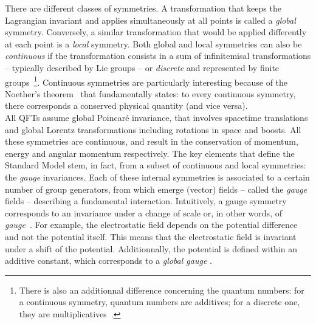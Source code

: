 There are different classes of symmetries. A transformation that keeps the Lagrangian invariant and applies simultaneously at all points is called a \textit{global} symmetry. Conversely, a similar transformation that would be applied differently at each point is a \textit{local} symmetry. Both global and local symmetries can also be \textit{continuous} if the transformation consists in a sum of infinitemisal transformations -- typically described by Lie groups -- or \textit{discrete} and represented by finite groups~\cite{peskinIntroductionQuantumField2018}\footnote{There is also an additionnal difference concerning the quantum numbers: for a continuous symmetry, quantum numbers are additives; for a discrete one, they are multiplicatives~\cite{braibantParticlesFundamentalInteractions2012}.}. Continuous symmetries are particularly interesting because of the Noether's theorem~\cite{noetherInvariantVariationProblems1971} that fundamentally states: to every continuous symmetry, there corresponds a conserved physical quantity (and vice versa).\\

All QFTs assume global Poincaré invariance, that involves spacetime translations and global Lorentz transformations including rotations in space and boosts. All these symmetries are continuous, and result in the conservation of momentum, energy and angular momentum respectively. The key elements that define the Standard Model stem, in fact, from a subset of continuous and local symmetries: the \textit{gauge} invariances. Each of these internal symmetries is associated to a certain number of group generators, from which emerge (vector) fields -- called the \textit{gauge} fields -- describing a fundamental interaction. Intuitively, a gauge symmetry corresponds to an invariance under a change of scale or, in other words, of \textit{gauge}~\cite{merriam-websterDefinitionGAUGE2023}. For example, the electrostatic field depends on the potential difference and not the potential itself. This means that the electrostatic field is invariant under a shift of the potential. Additionnally, the potential is defined within an additive constant, which corresponds to a \textit{global gauge} \cite{braibantParticlesFundamentalInteractions2012}.

